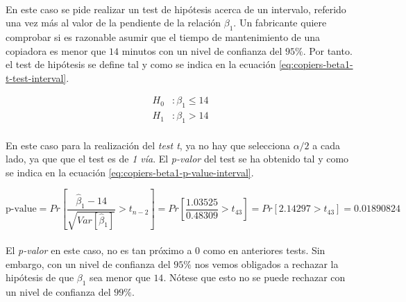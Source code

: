 \documentclass{article}
\begin{document}
        \paragraph{}
        En este caso se pide realizar un test de hipótesis acerca de un intervalo, referido una vez más al valor de la pendiente de la relación $\beta_1$. Un fabricante quiere comprobar si es razonable asumir que el tiempo de mantenimiento de una copiadora es menor que $14$ minutos con un nivel de confianza del $95\%$. Por tanto. el test de hipótesis se define tal y como se indica en la ecuación \eqref{eq:copiers-beta1-t-test-interval}.

        \begin{equation}
        \label{eq:copiers-beta1-t-test-interval}
          \begin{split}
            H_0&: \beta_1 \leq 14 \\
            H_1&: \beta_1 > 14
          \end{split}
        \end{equation}

        \paragraph{}
        En este caso para la realización del \emph{test t}, ya no hay que selecciona $\alpha/2$ a cada lado, ya que que el test es de \emph{1 vía}. El \emph{p-valor} del test se ha obtenido tal y como se indica en la ecuación \eqref{eq:copiers-beta1-p-value-interval}.

        \begin{equation}
          \label{eq:copiers-beta1-p-value-interval}
            \text{p-value}
            = Pr\left[\frac{\widehat{\beta}_1 - 14}{\sqrt{Var\left[\widehat{\beta}_1\right]}} > t_{n-2}\right]
            = Pr\left[\frac{1.03525}{0.48309} > t_{43}\right]
            = Pr\left[2.14297 > t_{43}\right]
            = 0.01890824
        \end{equation}

        \paragraph{}
        El \emph{p-valor} en este caso, no es tan próximo a $0$ como en anteriores tests. Sin embargo, con un nivel de confianza del $95\%$ nos vemos obligados a rechazar la hipótesis de que $\beta_1$ sea menor que $14$. Nótese que esto no se puede rechazar con un nivel de confianza del $99\%$.
\end{document}
